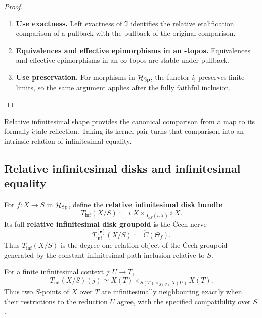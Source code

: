 \begin{proof}
\leavevmode
\begin{enumerate}[label=\textup{(\arabic*)}]
    \item \textbf{Use exactness.}
    Left exactness of \(\Im\) identifies the relative etalification comparison of a pullback
    with the pullback of the original comparison.

    \item \textbf{Equivalences and effective epimorphisms in an -topos.}
    Equivalences and effective epimorphisms in an \(\infty\)-topos are stable under pullback.

    \item \textbf{Use preservation.}
    For morphisms in \(\mathcal H_{\operatorname{Sp}}\), the functor \(i_!\) preserves finite limits, so the same
    argument applies after the fully faithful inclusion.
\end{enumerate}
\end{proof}
Relative infinitesimal shape provides the canonical comparison from a map to
its formally \(\acute{e}\)tale reflection. Taking its kernel pair turns that
comparison into an intrinsic relation of infinitesimal equality.

\subsection{Relative infinitesimal disks and infinitesimal equality}

\begin{definition}
\label{def:first-infinitesimal-neighbour-relation}
For \(f:X\to S\) in \(\mathcal H_{\operatorname{Sp}}\), define the \textbf{relative
infinitesimal disk bundle}
\[
    T_{\inf}(X/S)
    :=
    i_!X
    \times_{\Im_{i_!S}(i_!X)}
    i_!X.
\]
Its full \textbf{relative infinitesimal disk groupoid} is the \v{C}ech nerve
\[
    T_{\inf}^{[\bullet]}(X/S)
    :=
    \check C(\Theta_f).
\]
Thus \(T_{\inf}(X/S)\) is the degree-one relation object of the \v{C}ech
groupoid generated by the constant infinitesimal-path inclusion relative to
\(S\).
\end{definition}

\begin{proposition}
\label{prop:pointwise-infinitesimal-equality}
For a finite infinitesimal context \(j:U\to T\),
\[
    T_{\inf}(X/S)(j)
    \simeq
    X(T)
    \times_{S(T)\times_{S(U)}X(U)}
    X(T).
\]
Thus two \(S\)-points of \(X\) over \(T\) are infinitesimally neighbouring
exactly when their restrictions to the reduction \(U\) agree, with the
specified compatibility over \(S\).
\end{proposition}

